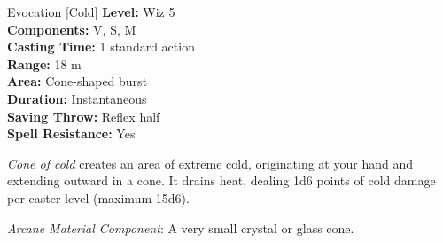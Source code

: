 {Evocation [Cold]}
{
	\textbf{Level:}
	Wiz 5\\
	\textbf{Components:}
	V, S, M\\
	\textbf{Casting Time:}
	1 standard action\\
	\textbf{Range:}
	18 m\\
	\textbf{Area:}
	Cone-shaped burst\\
	\textbf{Duration:}
	Instantaneous\\
	\textbf{Saving Throw:}
	Reflex half\\
	\textbf{Spell Resistance:}
	Yes\\
}
{
	\emph{Cone of cold} creates an area of extreme cold, originating at your hand and extending outward in a cone. It drains heat, dealing 1d6 points of cold damage per caster level (maximum 15d6).

	\textit{Arcane Material Component}:
	A very small crystal or glass cone.

}
